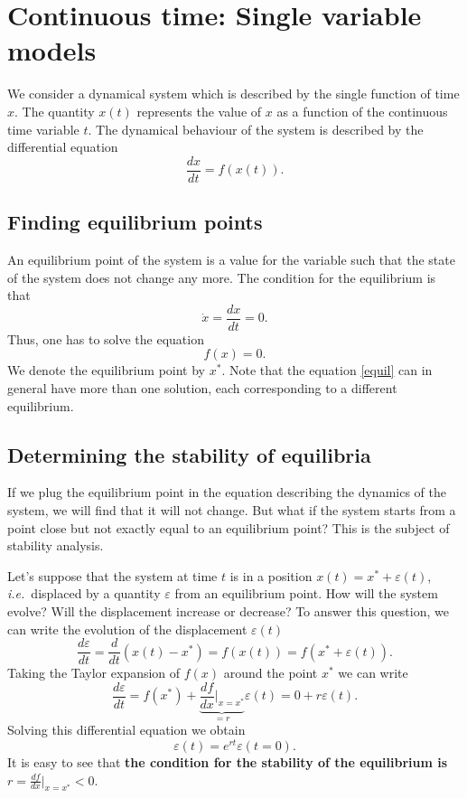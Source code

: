 \documentclass[Tutorial]{../cbg}\usepackage[]{graphicx}\usepackage[]{color}
\begin{document}
\section{Continuous time: Single variable models}
  We consider a dynamical system which is described by the single function of time $x$. The quantity $x(t)$ represents the value of $x$ as a function of the continuous time variable $t$.  The dynamical behaviour of the system is described by the differential equation
	\begin{equation}
		\frac{dx}{dt} = f(x(t)).
	\end{equation}
	
	\subsection{Finding equilibrium points}
	An equilibrium point of the system is a value for the variable such that the state of the system does not change any more. The condition for the equilibrium is that
	\begin{equation*}
		\dot{x} = \frac{dx}{dt} =0.
	\end{equation*}
	Thus, one has to solve the equation
	\begin{equation}
		\label{equil}
		f(x) = 0.
	\end{equation}
	We denote the equilibrium point by $x^*$. Note that the equation \ref{equil} can in general have more than one solution, each corresponding to a different  equilibrium.
	
	\subsection{Determining the stability of equilibria}
	If we plug the equilibrium point in the equation describing the dynamics of the system, we will find that it will not change. But what if the system starts from a point close but not exactly equal to an equilibrium point? This is the subject of stability analysis.
	
	Let's suppose that the system at time $t$ is in a position $x(t) = x^* + \varepsilon(t)$, \emph{i.e.}\ displaced by a quantity $\varepsilon$ from an equilibrium point. How will the system evolve? Will the displacement increase or decrease? To answer this question, we can write the evolution of the displacement $\varepsilon(t)$
	\begin{equation}
		\frac{d\varepsilon}{dt} = \frac{d}{dt}(x(t)-x^*) = f(x(t)) = f(x^* + \varepsilon(t)).
	\end{equation}
	Taking the Taylor expansion of  $f(x)$ around the point $x^*$ we can write
	\begin{equation}
		\frac{d\varepsilon}{dt} = f(x^*) + \underbrace{\frac{df}{dx}|_{x=x^*}}_{= r} \varepsilon(t) = 0 + r \varepsilon(t).
	\end{equation}
	Solving this differential equation we obtain
	\begin{equation}
		\varepsilon(t) = e^{rt}\varepsilon(t=0).
	\end{equation}
	It is easy to see that {\bf the condition for the stability of the equilibrium is $r = \frac{df}{dx}|_{x=x^*}  < 0$}.
\end{document}
